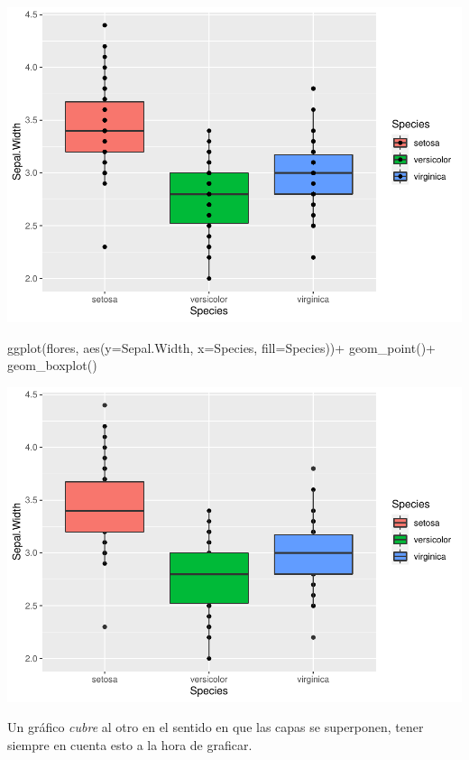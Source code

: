 \documentclass[
]{book}
\newenvironment{Shaded}{\begin{snugshade}}{\end{snugshade}}
\newcommand{\AttributeTok}[1]{\textcolor[rgb]{0.77,0.63,0.00}{#1}}
\newcommand{\FunctionTok}[1]{\textcolor[rgb]{0.00,0.00,0.00}{#1}}
\newcommand{\NormalTok}[1]{#1}
\newcommand{\SpecialCharTok}[1]{\textcolor[rgb]{0.00,0.00,0.00}{#1}}
\begin{document}
\includegraphics{Esatadistica_en_R_files/figure-latex/unnamed-chunk-152-1.pdf}

\begin{Shaded}
\begin{Highlighting}[]
\FunctionTok{ggplot}\NormalTok{(flores, }\FunctionTok{aes}\NormalTok{(}\AttributeTok{y=}\NormalTok{Sepal.Width, }\AttributeTok{x=}\NormalTok{Species, }\AttributeTok{fill=}\NormalTok{Species))}\SpecialCharTok{+}
  \FunctionTok{geom\_point}\NormalTok{()}\SpecialCharTok{+}
  \FunctionTok{geom\_boxplot}\NormalTok{()}
\end{Highlighting}
\end{Shaded}

\includegraphics{Esatadistica_en_R_files/figure-latex/unnamed-chunk-153-1.pdf}

Un gráfico \emph{cubre} al otro en el sentido en que las capas se superponen, tener siempre en cuenta esto a la hora de graficar.
\end{document}
